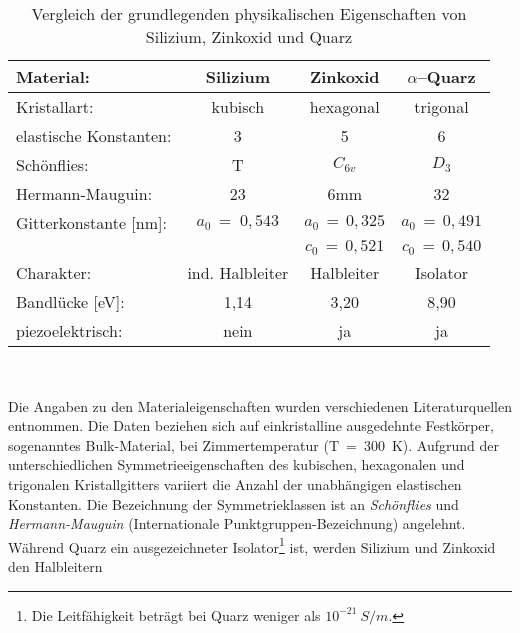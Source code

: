 \begin{table}[htb]
\caption{\label{tabsiznoquarz}
 Vergleich der grundlegenden physikalischen Eigenschaften von Silizium,
 Zinkoxid und Quarz}
\begin{center}
\begin{tabular}{|l||c|c|c|} \hline
{\bf Material:} & Silizium & Zinkoxid  & $ \alpha $--Quarz \\  \hline \hline
Kristallart: & kubisch  & hexagonal        & trigonal          \\ \hline
elastische Konstanten:                             & 3 & 5 & 6 \\ \hline
Schönflies:           & T  & $ C_{6v} $ & $ D_{3} $      \\ \hline
Hermann-Mauguin:      & 23 & 6mm             &  32            \\ \hline
Gitterkonstante [nm]: & $ a_{0} \, = \; 0,543 $ &
                        $ a_{0} \, = \, 0,325 $ &
                        $ a_{0} \, = \, 0,491 $                \\
                      &                          &
                        $ c_{0} \, = \, 0,521 $  &
                        $ c_{0} \, = \, 0,540 $                \\ \hline
Charakter:        & ind. Halbleiter &  Halbleiter & Isolator   \\ \hline
Bandlücke [eV]:   & 1,14            &  3,20       & 8,90       \\ \hline
piezoelektrisch:  & nein            &  ja         & ja         \\ \hline
\end{tabular}\\
\end{center}
\end{table}
Die Angaben zu den
Materialeigenschaften wurden verschiedenen Literaturquellen \cite{Kit88,
LB82, Tic80} entnommen. Die Daten beziehen sich auf einkristalline
ausgedehnte Festkörper, sogenanntes Bulk-Material, bei
Zimmertemperatur (T~=~300~K). Aufgrund der unterschiedlichen
Symmetrieeigenschaften des kubischen, hexagonalen und trigonalen
Kristallgitters variiert die Anzahl der unabhängigen elastischen
Konstanten. Die Bezeichnung der Symmetrieklassen ist an {\sl Schönflies}
und {\sl Hermann-Mauguin} (Internationale Punktgruppen-Bezeichnung)
angelehnt. Während Quarz ein ausgezeichneter
Isolator\footnote{Die Leitfähigkeit beträgt bei Quarz weniger als
$10^{-21} \: S/m$.} ist, werden Silizium und Zinkoxid den Halbleitern
